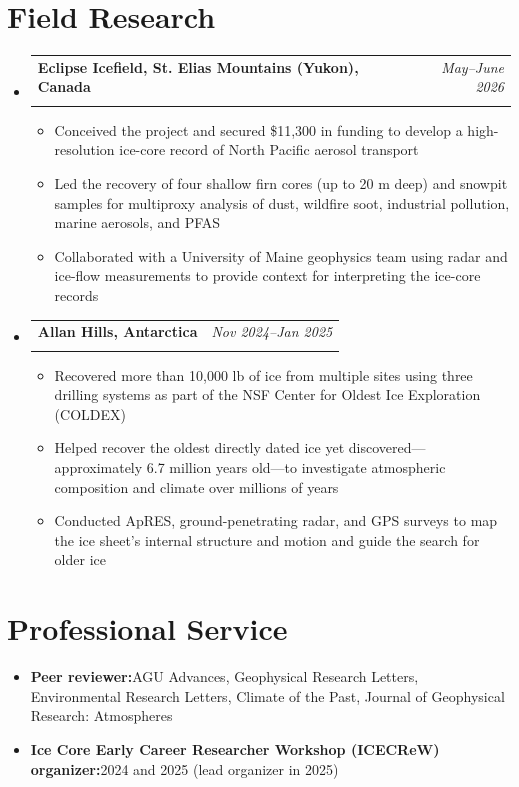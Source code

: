 \documentclass[a4paper,11pt]{article}
\makeatletter
\newcommand{\resumeItem}[2]{
  \item{
    \textbf{#1}{\hspace{0.5mm}#2 \vspace{-0.5mm}}
  }
}
\newcommand{\resumeProject}[4]{
\vspace{0.5mm}\item
    \begin{tabular*}{0.98\textwidth}[t]{l@{\extracolsep{\fill}}r}
        \textbf{#1} & \textit{\footnotesize{#3}} \\
        \footnotesize{\textit{#2}} & \footnotesize{#4}
    \end{tabular*}
    \vspace{-2.4mm}
}
\newcommand{\resumeSubItem}[2]{\resumeItem{#1}{#2}\vspace{-4pt}}
\newcommand{\resumeSubHeadingListStart}{\begin{itemize}[leftmargin=*,labelsep=1mm]}
\newcommand{\resumeHeadingSkillStart}{\begin{itemize}[leftmargin=*,itemsep=1.7mm, rightmargin=2ex]}
\newcommand{\resumeItemListStart}{\begin{itemize}[leftmargin=*,labelsep=1mm,itemsep=0.5mm]}
\newcommand{\resumeSubHeadingListEnd}{\end{itemize}}
\newcommand{\resumeHeadingSkillEnd}{\end{itemize}}
\newcommand{\resumeItemListEnd}{\end{itemize}\vspace{-2mm}}
\makeatother
\begin{document}
\section{\textbf{Field Research}}
\resumeSubHeadingListStart
\resumeProject
  {Eclipse Icefield, St. Elias Mountains (Yukon), Canada}{}
  {May--June 2026}{}
\vspace{-4mm}
\small{
\resumeItemListStart
  \item Conceived the project and secured \$11,300 in funding to develop a high-resolution ice-core record of North Pacific aerosol transport
  \item Led the recovery of four shallow firn cores (up to 20 m deep) and snowpit samples for multiproxy analysis of dust, wildfire soot, industrial pollution, marine aerosols, and PFAS
  \item Collaborated with a University of Maine geophysics team using radar and ice-flow measurements to provide context for interpreting the ice-core records
\resumeItemListEnd
}
\resumeProject
  {Allan Hills, Antarctica}{}
  {Nov 2024--Jan 2025}{}
\vspace{-4mm}
\small{
\resumeItemListStart
  \item Recovered more than 10,000 lb of ice from multiple sites using three drilling systems as part of the NSF Center for Oldest Ice Exploration (COLDEX)
  \item Helped recover the oldest directly dated ice yet discovered---approximately 6.7 million years old---to investigate atmospheric composition and climate over millions of years
  \item Conducted ApRES, ground-penetrating radar, and GPS surveys to map the ice sheet's internal structure and motion and guide the search for older ice
\resumeItemListEnd
}
\resumeSubHeadingListEnd

\section{\textbf{Professional Service}}
\resumeHeadingSkillStart
  \resumeSubItem{Peer reviewer:}
    {AGU Advances, Geophysical Research Letters, Environmental Research Letters, Climate of the Past, Journal of Geophysical Research: Atmospheres}
  \resumeSubItem{Ice Core Early Career Researcher Workshop (ICECReW) organizer:}
    {2024 and 2025 (lead organizer in 2025)}
\resumeHeadingSkillEnd
\end{document}
